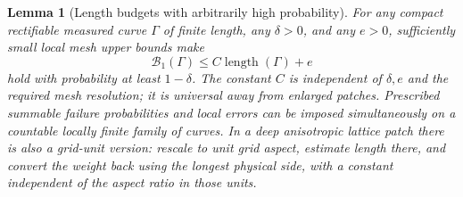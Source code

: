\documentclass[11pt]{article}
\numberwithin{equation}{section}
\newtheorem{lemma}[theorem]{Lemma}
\theoremstyle{definition}
\theoremstyle{remark}
\begin{document}
\begin{lemma}[Length budgets with arbitrarily high probability]
\label{lt:curve-probability}
For any compact rectifiable measured curve $\Gamma$ of finite
length, any $\delta>0$, and any $e>0$, sufficiently small local
mesh upper bounds make
\begin{equation}
 \mathcal B_1(\Gamma)\leq C\operatorname{length}(\Gamma)+e
 \label{lt:curve-high-probability}
\end{equation}
hold with probability at least $1-\delta$.  The constant $C$ is
independent of $\delta,e$ and the required mesh resolution; it is
universal away from enlarged patches.  Prescribed summable failure
probabilities and local errors can be imposed simultaneously on a
countable locally finite family of curves.  In a deep anisotropic
lattice patch there is also a grid-unit version: rescale to unit
grid aspect, estimate length there, and convert the weight back
using the longest physical side, with a constant independent of
the aspect ratio in those units.
\end{lemma}
\end{document}
